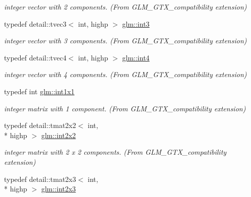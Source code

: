 \begin{DoxyCompactItemize}
\begin{DoxyCompactList}\small\item\em integer vector with 2 components. (From G\-L\-M\-\_\-\-G\-T\-X\-\_\-compatibility extension) \end{DoxyCompactList}\item 
\hypertarget{group__gtx__compatibility_gac305b0da08fad90d91854569679c935e}{typedef detail\-::tvec3$<$ int, highp $>$ \hyperlink{group__gtx__compatibility_gac305b0da08fad90d91854569679c935e}{glm\-::int3}}\label{group__gtx__compatibility_gac305b0da08fad90d91854569679c935e}

\begin{DoxyCompactList}\small\item\em integer vector with 3 components. (From G\-L\-M\-\_\-\-G\-T\-X\-\_\-compatibility extension) \end{DoxyCompactList}\item 
\hypertarget{group__gtx__compatibility_ga9f621a690aa1c2918a9a8a684376b562}{typedef detail\-::tvec4$<$ int, highp $>$ \hyperlink{group__gtx__compatibility_ga9f621a690aa1c2918a9a8a684376b562}{glm\-::int4}}\label{group__gtx__compatibility_ga9f621a690aa1c2918a9a8a684376b562}

\begin{DoxyCompactList}\small\item\em integer vector with 4 components. (From G\-L\-M\-\_\-\-G\-T\-X\-\_\-compatibility extension) \end{DoxyCompactList}\item 
\hypertarget{group__gtx__compatibility_ga09016a637a3cd093c22e6188080ac750}{typedef int \hyperlink{group__gtx__compatibility_ga09016a637a3cd093c22e6188080ac750}{glm\-::int1x1}}\label{group__gtx__compatibility_ga09016a637a3cd093c22e6188080ac750}

\begin{DoxyCompactList}\small\item\em integer matrix with 1 component. (From G\-L\-M\-\_\-\-G\-T\-X\-\_\-compatibility extension) \end{DoxyCompactList}\item 
\hypertarget{group__gtx__compatibility_ga7762d2b809aab75003e7e7873ca74a2f}{typedef detail\-::tmat2x2$<$ int, \\*
highp $>$ \hyperlink{group__gtx__compatibility_ga7762d2b809aab75003e7e7873ca74a2f}{glm\-::int2x2}}\label{group__gtx__compatibility_ga7762d2b809aab75003e7e7873ca74a2f}

\begin{DoxyCompactList}\small\item\em integer matrix with 2 x 2 components. (From G\-L\-M\-\_\-\-G\-T\-X\-\_\-compatibility extension) \end{DoxyCompactList}\item 
\hypertarget{group__gtx__compatibility_ga42c3d6e4924de559104b9ca2b127c9ac}{typedef detail\-::tmat2x3$<$ int, \\*
highp $>$ \hyperlink{group__gtx__compatibility_ga42c3d6e4924de559104b9ca2b127c9ac}{glm\-::int2x3}}\label{group__gtx__compatibility_ga42c3d6e4924de559104b9ca2b127c9ac}


\end{DoxyCompactItemize}

